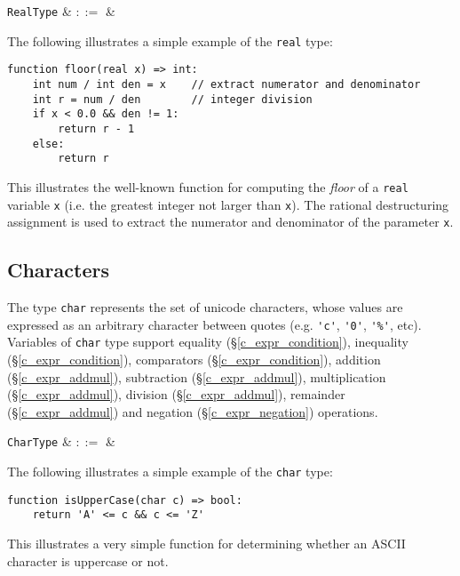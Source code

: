\begin{syntax}
  \verb+RealType+ & $::=$ &  \\
\end{syntax}

\noindent The following illustrates a simple example of the \lstinline{real} type:

\begin{lstlisting}
function floor(real x) => int:
    int num / int den = x    // extract numerator and denominator
    int r = num / den        // integer division
    if x < 0.0 && den != 1: 	 
        return r - 1 
    else:
        return r 
\end{lstlisting}
This illustrates the well-known function for computing the {\em floor} of a \lstinline{real} variable \lstinline{x} (i.e. the greatest integer not larger than \lstinline{x}).  The rational destructuring assignment is used to extract the numerator and denominator of the parameter \lstinline{x}.


\subsection{Characters}
\label{c_types_char}

The type \lstinline{char} represents the set of unicode characters, whose values are expressed as an arbitrary character between quotes (e.g. \lstinline{'c'}, \lstinline{'0'}, \lstinline{'%'}, etc).  Variables of \lstinline{char} type support equality (\S\ref{c_expr_condition}), inequality (\S\ref{c_expr_condition}), comparators (\S\ref{c_expr_condition}), addition (\S\ref{c_expr_addmul}), subtraction (\S\ref{c_expr_addmul}), multiplication (\S\ref{c_expr_addmul}), division (\S\ref{c_expr_addmul}), remainder (\S\ref{c_expr_addmul}) and negation (\S\ref{c_expr_negation}) operations. 

\begin{syntax}
  \verb+CharType+ & $::=$ &  \\
\end{syntax}

\noindent The following illustrates a simple example of the \lstinline{char} type:

\begin{lstlisting}
function isUpperCase(char c) => bool:
    return 'A' <= c && c <= 'Z'
\end{lstlisting}
This illustrates a very simple function for determining whether an ASCII character is uppercase or not.

